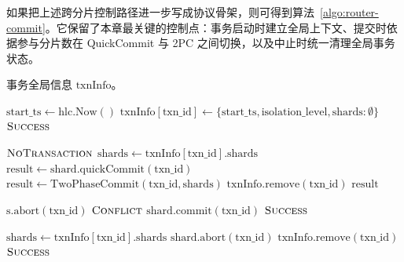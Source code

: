 如果把上述跨分片控制路径进一步写成协议骨架，则可得到算法~\ref{algo:router-commit}。它保留了本章最关键的控制点：事务启动时建立全局上下文、提交时依据参与分片数在 QuickCommit 与 2PC 之间切换，以及中止时统一清理全局事务状态。

\begin{algorithm}[htbp]
  \newcommand{\txninfo}{$\text{txnInfo}$}
  \newcommand{\hlc}{$\text{hlc}$}
  \caption{路由服务器协议：开始、提交与回滚}
  \label{algo:router-commit}
  \begin{algorithmic}[1]
    \Require 事务全局信息 \txninfo。

    \State $\text{start\_ts} \gets \text{hlc}.\text{Now}()$ 
    \State $\text{txnInfo}[\text{txn\_id}] \gets \{\text{start\_ts}, \text{isolation\_level}, \text{shards}: \emptyset\}$
    \State \Return $\textsc{Success}$
    \EndProcedure

    \State \Return $\textsc{NoTransaction}$
    \EndIf
    \State $\text{shards} \gets \text{txnInfo}[\text{txn\_id}].\text{shards}$
    \State $\text{result} \gets \text{shard}.\text{quickCommit}(\text{txn\_id})$ 
    \Else
    \State $\text{result} \gets \text{TwoPhaseCommit}(\text{txn\_id}, \text{shards})$
    \EndIf
    \State $\text{txnInfo}.\text{remove}(\text{txn\_id})$ 
    \State \Return $\text{result}$
    \EndProcedure

    \State $\text{s}.\text{abort}(\text{txn\_id})$ 
    \EndFor
    \State \Return $\textsc{Conflict}$
    \EndIf
    \EndFor
    \State $\text{shard}.\text{commit}(\text{txn\_id})$
    \EndFor
    \State \Return $\textsc{Success}$
    \EndProcedure

    \State $\text{shards} \gets \text{txnInfo}[\text{txn\_id}].\text{shards}$
    \State $\text{shard}.\text{abort}(\text{txn\_id})$
    \EndFor
    \State $\text{txnInfo}.\text{remove}(\text{txn\_id})$
    \EndIf
    \State \Return $\textsc{Success}$
    \EndProcedure
  \end{algorithmic}
\end{algorithm}

